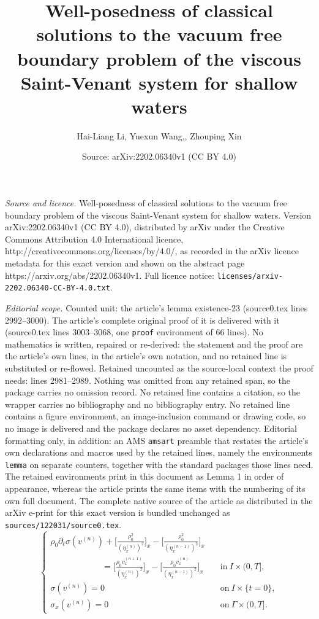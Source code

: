 \documentclass[10pt,a4paper]{amsart}
\title{Well-posedness of classical solutions to the vacuum free boundary problem of the viscous Saint-Venant system for shallow waters}
\author{Hai-Liang Li, Yuexun Wang,, Zhouping Xin}
\date{Source: arXiv:2202.06340v1 (CC BY 4.0)}
\begin{document}
\maketitle

\noindent\emph{Source and licence.} Well-posedness of classical solutions to the vacuum free boundary problem of the viscous Saint-Venant system for shallow waters. Version arXiv:2202.06340v1 (CC BY 4.0), distributed by arXiv under the Creative Commons Attribution 4.0 International licence, http://creativecommons.org/licenses/by/4.0/, as recorded in the arXiv licence metadata for this exact version and shown on the abstract page https://arxiv.org/abs/2202.06340v1. Full licence notice: \texttt{licenses/arxiv-2202.06340-CC-BY-4.0.txt}.\par\smallskip

\noindent\textit{Editorial scope.} Counted unit: the article's lemma existence-23 (source0.tex lines 2992--3000). The article's complete original proof of it is delivered with it (source0.tex lines 3003--3068, one \texttt{proof} environment of 66 lines). No mathematics is written, repaired or re-derived: the statement and the proof are the article's own lines, in the article's own notation, and no retained line is substituted or re-flowed.  Retained uncounted as the source-local context the proof needs: lines 2981--2989.  Nothing was omitted from any retained span, so the package carries no omission record.  No retained line contains a citation, so the wrapper carries no bibliography and no bibliography entry.  No retained line contains a figure environment, an image-inclusion command or drawing code, so no image is delivered and the package declares no asset dependency.  Editorial formatting only, in addition: an AMS \texttt{amsart} preamble that restates the article's own declarations and macros used by the retained lines, namely the environments \texttt{lemma} on separate counters, together with the standard packages those lines need.  The retained environments print in this document as Lemma 1 in order of appearance, whereas the article prints the same items with the numbering of its own full document.  The complete native source of the article as distributed in the arXiv e-print for this exact version is bundled unchanged as \texttt{sources/122031/source0.tex}.
\begin{equation}\label{existence-22}
	\begin{cases}
		\rho_0\partial_t\sigma(v^{(n)})+\bigg[\frac{\rho_0^2}{(\eta_x^{(n)})^2}\bigg]_x-\bigg[\frac{\rho_0^2}{(\eta_x^{(n-1)})^2}\bigg]_x\\
		\qquad\qquad\qquad=\bigg[\frac{\rho_0v_x^{(n+1)}}{(\eta_x^{(n)})^2}\bigg]_x
		-\bigg[\frac{\rho_0v_x^{(n)}}{(\eta_x^{(n-1)})^2}\bigg]_x &\quad \mbox{in}\ I\times (0,T],\\
	\sigma(v^{(n)})=0 &\quad \mbox{on}\ I\times \{t=0\},\\
	\sigma_x(v^{(n)})=0 &\quad \mbox{on}\ \Gamma\times (0,T].
	\end{cases}
\end{equation}
\end{document}
